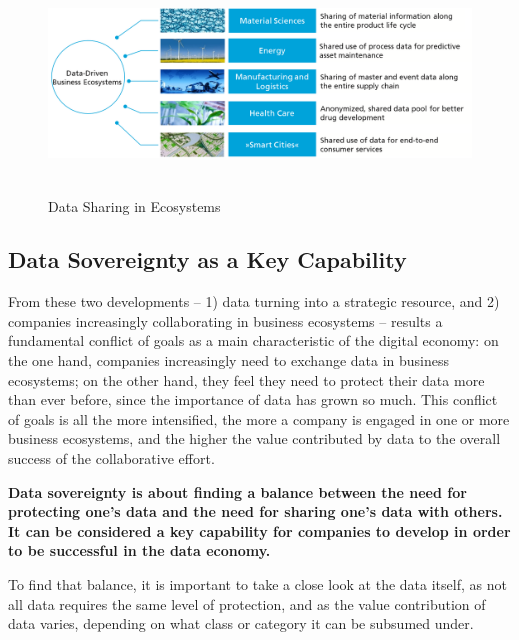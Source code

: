 \begin{figure}[H]
	\begin{Center}
		\includegraphics[width=6.42in,height=2.27in]{./media/image12.png}
		\caption{Data Sharing in Ecosystems}
		\label{fig:_Data-Driven_Business_Ecosystems_examples}
	\end{Center}
\end{figure}





\subsection{Data Sovereignty as a Key Capability}\label{subsec:datasovereignty_as_key_enabler}
From these two developments – 1) data turning into a strategic resource, and 2) companies increasingly collaborating in business ecosystems – results a fundamental conflict of goals as a main characteristic of the digital economy: on the one hand, companies increasingly need to exchange data in business ecosystems; on the other hand, they feel they need to protect their data more than ever before, since the importance of data has grown so much. This conflict of goals is all the more intensified, the more a company is engaged in one or more business ecosystems, and the higher the value contributed by data to the overall success of the collaborative effort.

\textbf{Data sovereignty is about finding a balance between the need for protecting one’s data and the need for sharing one’s data with others. It can be considered a key capability for companies to develop in order to be successful in the data economy.}

To find that balance, it is important to take a close look at the data itself, as not all data requires the same level of protection, and as the value contribution of data varies, depending on what class or category it can be subsumed under.

